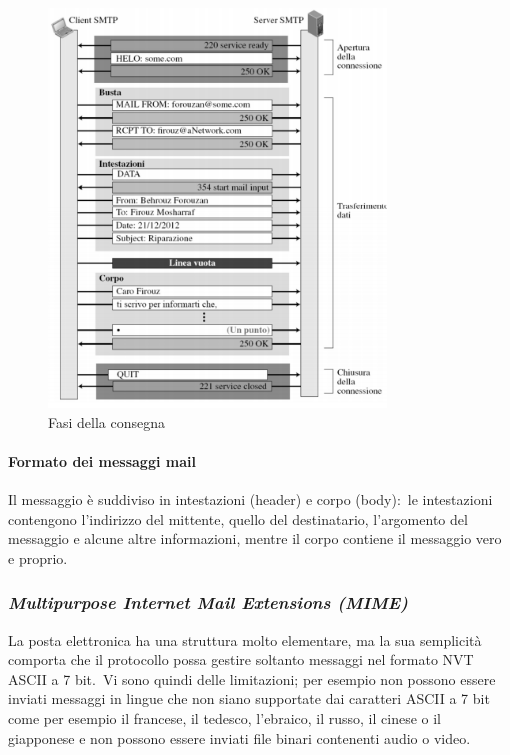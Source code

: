 \begin{figure}[H]
    \centering
    \includegraphics[width=0.8\textwidth]{immagini/SMTP.png}
    \caption*{Fasi della consegna}
\end{figure}

\paragraph{Formato dei messaggi mail}

Il messaggio è suddiviso in intestazioni (header) e corpo (body):\ le intestazioni contengono l'indirizzo del mittente, quello del destinatario, l'argomento del messaggio e alcune altre informazioni, mentre il corpo contiene il messaggio vero e proprio.

\subsubsection{\emph{Multipurpose Internet Mail Extensions (MIME)}}

La posta elettronica ha una struttura molto elementare, ma la sua semplicità comporta che il protocollo possa gestire soltanto messaggi nel formato NVT ASCII a 7 bit.\
Vi sono quindi delle limitazioni; per esempio non possono essere inviati messaggi in lingue che non siano supportate dai caratteri ASCII a 7 bit come per esempio il francese, il tedesco, l'ebraico, il russo, il cinese o il giapponese e non possono essere inviati file binari contenenti audio o video.

